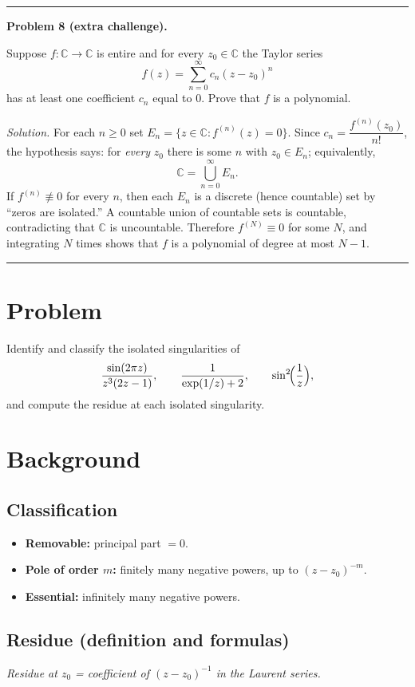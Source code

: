 \documentclass[12pt,a4paper]{article}
\newcommand{\secdiv}{\par\vspace{0.6em}\hrule\par\vspace{0.8em}}
\newcommand{\subhead}[1]{\par\textbf{#1}\par\vspace{0.35em}}
\begin{document}
	\secdiv
	
	\subhead{Problem 8 (extra challenge).}
	
	Suppose $f:\mathbb C\to\mathbb C$ is entire and for every $z_0\in\mathbb C$ the Taylor series
	\[
	f(z)=\sum_{n=0}^{\infty} c_n (z-z_0)^n
	\]
	has at least one coefficient $c_n$ equal to $0$. Prove that $f$ is a polynomial.
	
	\emph{Solution.}
	For each $n\ge 0$ set $E_n=\{z\in\mathbb C: f^{(n)}(z)=0\}$. Since $c_n=\dfrac{f^{(n)}(z_0)}{n!}$,
	the hypothesis says: for \emph{every} $z_0$ there is some $n$ with $z_0\in E_n$; equivalently,
	\[
	\mathbb C=\bigcup_{n=0}^{\infty} E_n.
	\]
	If $f^{(n)}\not\equiv 0$ for every $n$, then each $E_n$ is a discrete (hence countable) set by
	“zeros are isolated.” A countable union of countable sets is countable, contradicting that
	$\mathbb C$ is uncountable. Therefore $f^{(N)}\equiv 0$ for some $N$, and integrating $N$ times
	shows that $f$ is a polynomial of degree at most $N-1$.
	
	\secdiv
	

\section*{Problem}
Identify and classify the isolated singularities of
\[
\frac{\sin(2\pi z)}{z^3(2z-1)},\qquad
\frac{1}{\exp(1/z)+2},\qquad
\sin^2\!\Bigl(\frac{1}{z}\Bigr),
\]
and compute the residue at each isolated singularity.

\section*{Background}

\subsection*{Classification}
\begin{itemize}
	\item \textbf{Removable:} principal part $=0$.
	\item \textbf{Pole of order $m$:} finitely many negative powers,
	up to $(z-z_0)^{-m}$.
	\item \textbf{Essential:} infinitely many negative powers.
\end{itemize}

\subsection*{Residue (definition and formulas)}
\textit{Residue at $z_0$ = coefficient of $(z-z_0)^{-1}$ in the Laurent series.}
\end{document}
